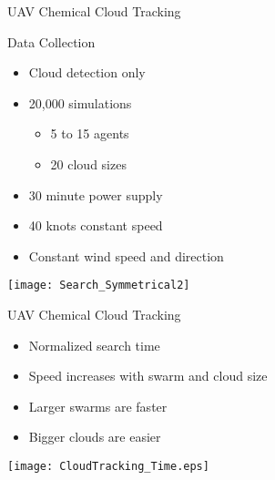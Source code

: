 
\begin{slide}{UAV Chemical Cloud Tracking}
  \hfill
  \begin{minipage}{.45\textwidth}
    Data Collection
    \begin{itemize}
    \item Cloud detection only
    \item 20,000 simulations
      \begin{itemize}
      \item 5 to 15 agents
      \item 20 cloud sizes
      \end{itemize}
    \item 30 minute power supply
    \item 40 knots constant speed
    \item Constant wind speed and direction
    \end{itemize}
  \end{minipage}
  \hfill
  \begin{minipage}{.45\textwidth}
    \begin{center}
      \texttt{[image: Search\_Symmetrical2]}
    \end{center}
  \end{minipage}
  \hfill
\end{slide}


\begin{slide}{UAV Chemical Cloud Tracking}
  \begin{minipage}{.3\textwidth}
    \begin{itemize}
    \item Normalized search time
    \item Speed increases with swarm and cloud size
    \item Larger swarms are faster
    \item Bigger clouds are easier
    \end{itemize}
  \end{minipage}
  \hfill
  \begin{minipage}{.6\textwidth}
    \texttt{[image: CloudTracking\_Time.eps]}
  \end{minipage}
  \hfill
\end{slide}

